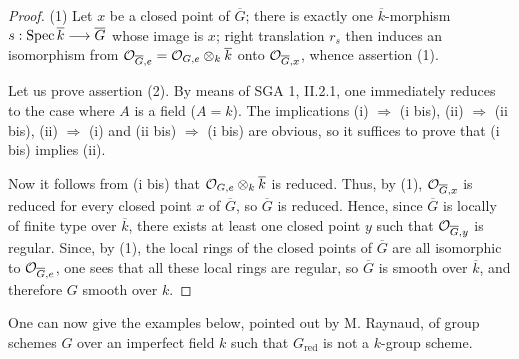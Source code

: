 \begin{proof}
(1) Let $x$ be a closed point of $\overline G$; there is exactly one $\overline k$-morphism $s:\operatorname{Spec}\overline k\longrightarrow\overline G$ whose image is $x$; right translation $r_s$ then induces an isomorphism from $\mathcal{O}_{\overline G,e}=\mathcal{O}_{G,e}\otimes_k\overline k$ onto $\mathcal{O}_{\overline G,x}$, whence assertion (1).

Let us prove assertion (2). By means of SGA 1, II.2.1, one immediately reduces to the case where $A$ is a field ($A=k$). The implications (i) $\Rightarrow$ (i bis), (ii) $\Rightarrow$ (ii bis), (ii) $\Rightarrow$ (i) and (ii bis) $\Rightarrow$ (i bis) are obvious, so it suffices to prove that (i bis) implies (ii).

Now it follows from (i bis) that $\mathcal{O}_{G,e}\otimes_k\overline k$ is reduced. Thus, by (1), $\mathcal{O}_{\overline G,x}$ is reduced for every closed point $x$ of $\overline G$, so $\overline G$ is reduced. Hence, since $\overline G$ is locally of finite type over $\overline k$, there exists at least one closed point $y$ such that $\mathcal{O}_{\overline G,y}$ is regular. Since, by (1), the local rings of the closed points of $\overline G$ are all isomorphic to $\mathcal{O}_{\overline G,e}$, one sees that all these local rings are regular, so $\overline G$ is smooth over $\overline k$, and therefore $G$ smooth over $k$.
\end{proof}
One can now give the examples below, pointed out by M. Raynaud, of group schemes $G$ over an imperfect field $k$ such that $G_{\mathrm{red}}$ is not a $k$-group scheme.
